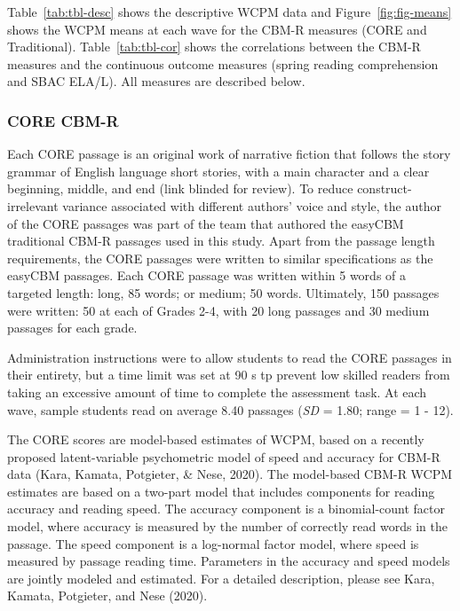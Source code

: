 \documentclass[
  english,
  man, fleqn, noextraspace]{apa6}
\begin{document}
Table~\ref{tab:tbl-desc} shows the descriptive WCPM data and Figure~\ref{fig:fig-means} shows the WCPM means at each wave for the CBM-R measures (CORE and Traditional). Table~\ref{tab:tbl-cor} shows the correlations between the CBM-R measures and the continuous outcome measures (spring reading comprehension and SBAC ELA/L). All measures are described below.

\hypertarget{core-cbm-r}{%
\subsubsection{CORE CBM-R}\label{core-cbm-r}}

Each CORE passage is an original work of narrative fiction that follows the story grammar of English language short stories, with a main character and a clear beginning, middle, and end (link blinded for review). To reduce construct-irrelevant variance associated with different authors' voice and style, the author of the CORE passages was part of the team that authored the easyCBM traditional CBM-R passages used in this study. Apart from the passage length requirements, the CORE passages were written to similar specifications as the easyCBM passages. Each CORE passage was written within 5 words of a targeted length: long, 85 words; or medium; 50 words. Ultimately, 150 passages were written: 50 at each of Grades 2-4, with 20 long passages and 30 medium passages for each grade.

Administration instructions were to allow students to read the CORE passages in their entirety, but a time limit was set at 90 s tp prevent low skilled readers from taking an excessive amount of time to complete the assessment task. At each wave, sample students read on average 8.40 passages (\emph{SD} = 1.80; range = 1 - 12).

The CORE scores are model-based estimates of WCPM, based on a recently proposed latent-variable psychometric model of speed and accuracy for CBM-R data (Kara, Kamata, Potgieter, \& Nese, 2020). The model-based CBM-R WCPM estimates are based on a two-part model that includes components for reading accuracy and reading speed. The accuracy component is a binomial-count factor model, where accuracy is measured by the number of correctly read words in the passage. The speed component is a log-normal factor model, where speed is measured by passage reading time. Parameters in the accuracy and speed models are jointly modeled and estimated. For a detailed description, please see Kara, Kamata, Potgieter, and Nese (2020).
\end{document}
